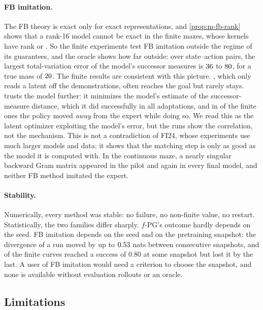 \paragraph{FB imitation.}
The FB theory is exact only for exact representations, and \cref{prop:m-fb-rank} shows that a rank-16 model cannot be exact in the finite mazes, whose kernels have rank  or .
So the finite experiments test FB imitation outside the regime of its guarantees, and the oracle shows how far outside: over state--action pairs, the largest total-variation error of the model's successor measures is $\vn{s15.tv.lo}{36}$ to $\vn{s15.tv.hi}{80}$, for a true mass of $\vn{const.mass}{20}$.
The finite results are consistent with this picture.
\ERFB, which only reads a latent off the demonstrations, often reaches the goal but rarely stays.
\DMFB{} trusts the model further: it minimizes the model's estimate of the successor-measure distance, which it did successfully in all  adaptations, and in  of the  finite ones the policy moved \emph{away} from the expert while doing so.
We read this as the latent optimizer exploiting the model's error, but the runs show the correlation, not the mechanism.
This is not a contradiction of FI24, whose experiments use much larger models and data; it shows that the matching step is only as good as the model it is computed with.
In the continuous maze, a nearly singular backward Gram matrix appeared in the pilot and again in every final model, and neither FB method imitated the expert.

\paragraph{Stability.}
Numerically, every method was stable: no failure, no non-finite value, no restart.
Statistically, the two families differ sharply.
$f$-PG's outcome hardly depends on the seed.
FB imitation depends on the seed and on the pretraining snapshot: the divergence of a run moved by up to $\vn{s11.swing}{0.53}$ nats between consecutive snapshots, and  of the finite curves reached a success of $0.80$ at some snapshot but lost it by the last.
A user of FB imitation would need a criterion to choose the snapshot, and none is available without evaluation rollouts or an oracle.

\subsection{Limitations}

